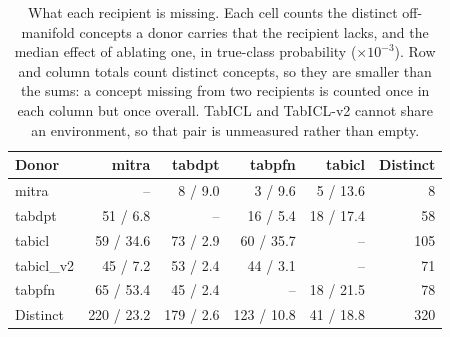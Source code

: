 \begin{table}[t]
\centering
\caption{What each recipient is missing. Each cell counts the distinct off-manifold concepts a donor carries that the recipient lacks, and the median effect of ablating one, in true-class probability ($\times 10^{-3}$). Row and column totals count distinct concepts, so they are smaller than the sums: a concept missing from two recipients is counted once in each column but once overall. TabICL and TabICL-v2 cannot share an environment, so that pair is unmeasured rather than empty.}
\label{tab:patch_diagnosis}
\small
\begin{tabular}{lrrrrr}
\toprule
Donor & mitra & tabdpt & tabpfn & tabicl & Distinct \\
\midrule
mitra & -- & 8 / 9.0 & 3 / 9.6 & 5 / 13.6 & 8 \\
tabdpt & 51 / 6.8 & -- & 16 / 5.4 & 18 / 17.4 & 58 \\
tabicl & 59 / 34.6 & 73 / 2.9 & 60 / 35.7 & -- & 105 \\
tabicl\_v2 & 45 / 7.2 & 53 / 2.4 & 44 / 3.1 & -- & 71 \\
tabpfn & 65 / 53.4 & 45 / 2.4 & -- & 18 / 21.5 & 78 \\
\midrule
Distinct & 220 / 23.2 & 179 / 2.6 & 123 / 10.8 & 41 / 18.8 & 320 \\
\bottomrule
\end{tabular}
\end{table}

